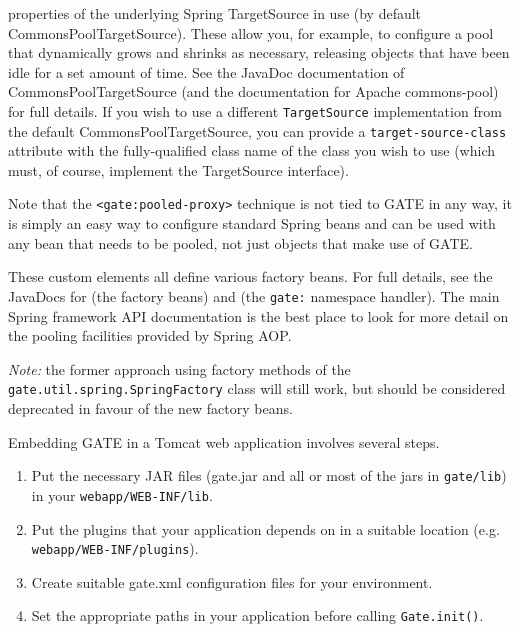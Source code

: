 properties of the underlying Spring TargetSource in use (by default
CommonsPoolTargetSource).  These allow you, for example, to configure a pool
that dynamically grows and shrinks as necessary, releasing objects that have
been idle for a set amount of time.  See the
%
{JavaDoc documentation of CommonsPoolTargetSource} (and the documentation for
Apache commons-pool) for full details.  If you wish to use a different
\verb|TargetSource| implementation from the default CommonsPoolTargetSource,
you can provide a \verb|target-source-class| attribute with the fully-qualified
class name of the class you wish to use (which must, of course, implement the
TargetSource interface).

Note that the \verb|<gate:pooled-proxy>| technique is not tied to GATE in any
way, it is simply an easy way to configure standard Spring beans and can be
used with any bean that needs to be pooled, not just objects that make use of
GATE.


These custom elements all define various factory beans.  For full details, see
the JavaDocs for \texttt{}
(the factory beans) and \texttt{}
(the \texttt{gate:} namespace handler).  The main Spring framework API
documentation is the best place to look for more detail on the pooling
facilities provided by Spring AOP.

\emph{Note:} the former approach using factory methods of the
\texttt{gate.util.spring.SpringFactory} class will still work, but should be
considered deprecated in favour of the new factory beans.


Embedding GATE in a Tomcat web application involves several steps.
\begin{enumerate}
\item
Put the necessary JAR files (gate.jar and all or most of the jars in
{\tt gate/lib}) in your {\tt webapp/WEB-INF/lib}.
\item
Put the plugins that your application depends on in a suitable location (e.g.
{\tt webapp/WEB-INF/plugins}).
\item
Create suitable gate.xml configuration files for your environment.
\item
Set the appropriate paths in your application before calling {\tt Gate.init()}.
\end{enumerate}

